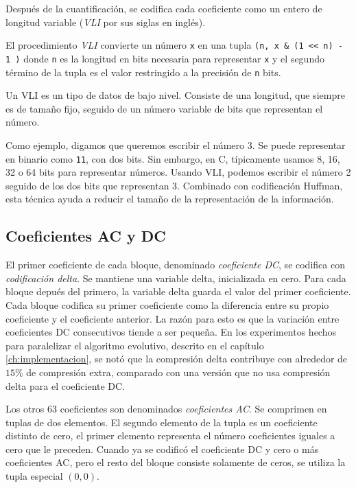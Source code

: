Después de la cuantificación, se codifica cada coeficiente como un entero de
longitud variable (\emph{\gls{VLI}} por sus siglas en inglés).

El procedimiento \emph{VLI} convierte un número \verb+x+ en una tupla \verb+(n, x & (1 << n) - 1 )+
donde \verb+n+ es la longitud en bits necesaria para
representar \verb+x+ y el segundo término de la tupla es el valor restringido a
la precisión de \verb+n+ bits.

Un VLI es un tipo de datos de bajo nivel. Consiste de una longitud, que siempre
es de tamaño fijo, seguido de un número variable de bits que representan el
número.

Como ejemplo, digamos que queremos escribir el número 3. Se puede representar
en binario como \verb+11+, con dos bits. Sin embargo, en C, típicamente usamos
8, 16, 32 o 64 bits para representar números. Usando VLI, podemos escribir el
número 2 seguido de los dos bits que representan 3. Combinado con codificación
Huffman, esta técnica ayuda a reducir el tamaño de la representación de la
información.

\subsection{Coeficientes AC y DC}\label{sub:acdc}

El primer coeficiente de cada bloque, denominado \emph{\gls{coeficiente DC}},
se codifica con \emph{\gls{codificación delta}}. Se mantiene una variable
delta, inicializada en cero. Para cada bloque depués del primero, la variable
delta guarda el valor del primer coeficiente. Cada bloque codifica su primer
coeficiente como la diferencia entre su propio coeficiente y el coeficiente
anterior. La razón para esto es que la variación entre coeficientes DC
consecutivos tiende a ser pequeña. En los experimentos hechos para paralelizar
el algoritmo evolutivo, descrito en el capítulo \ref{ch:implementacion}, se
notó que la compresión delta contribuye con alrededor de $15\%$ de compresión
extra, comparado con una versión que no usa compresión delta para el
coeficiente DC.

Los otros 63 coeficientes son denominados \emph{\gls{coeficientes AC}}. Se
comprimen en tuplas de dos elementos. El segundo elemento de la tupla es un
coeficiente distinto de cero, el primer elemento representa el número
coeficientes iguales a cero que le preceden. Cuando ya se codificó el
coeficiente DC y cero o más coeficientes AC, pero el resto del bloque consiste
solamente de ceros, se utiliza la tupla especial $(0,0)$.


